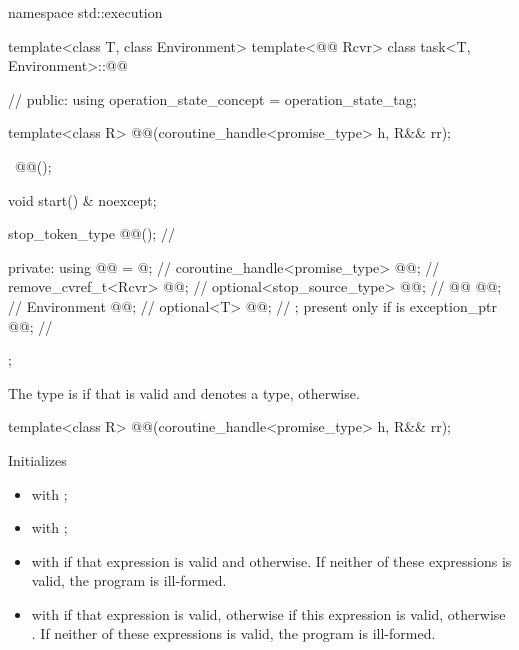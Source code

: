 \begin{codeblock}
namespace std::execution {
  template<class T, class Environment>
  template<@@ Rcvr>
  class task<T, Environment>::@@ {           // \expos
  public:
    using operation_state_concept = operation_state_tag;

    template<class R>
      @@(coroutine_handle<promise_type> h, R&& rr);

    ~@@();

    void start() & noexcept;

    stop_token_type @@();           // \expos

  private:
    using @@ = @\seebelownc@;                // \expos
    coroutine_handle<promise_type> @@;      // \expos
    remove_cvref_t<Rcvr>           @@;        // \expos
    optional<stop_source_type>     @@;      // \expos
    @@                      @@;     // \expos
    Environment                    @@; // \expos
    optional<T>                    @@;      // \expos; present only if  is 
    exception_ptr                  @@;       // \expos
  };
}
\end{codeblock}

\pnum
The type  is  if that
 is valid and denotes a type,  otherwise.

%
\begin{itemdecl}
template<class R>
  @@(coroutine_handle<promise_type> h, R&& rr);
\end{itemdecl}
\begin{itemdescr}
\pnum
\effects
Initializes
\begin{itemize}
\item {} with ;
\item {} with ;
\item {}
with  if that expression
is valid and  otherwise.
If neither of these expressions is valid, the program is ill-formed.
\item {} with
 if that expression is
valid, otherwise 
if this expression is valid, otherwise .
If neither of these expressions is valid, the program is ill-formed.
\end{itemize}
\end{itemdescr}

